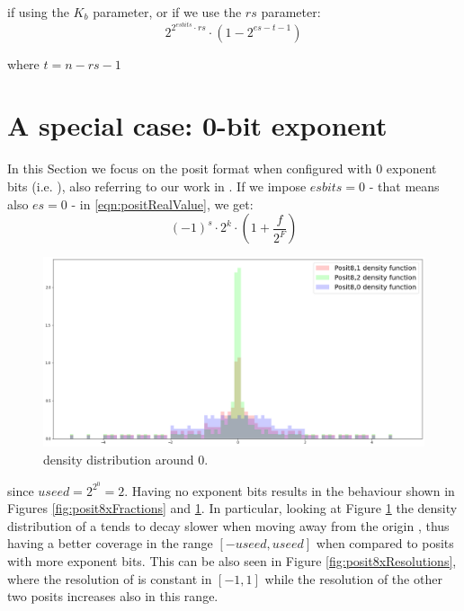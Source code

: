 if using the $K_b$ parameter, or if we use the $rs$ parameter:
\begin{equation}
    2^{2^{esbits} \cdot rs} \cdot (1 - 2^{es - t - 1})
\end{equation}

where $ t = n - rs - 1$
\section{A special case: 0-bit exponent}\label{sec:Posit0bitExponent}

In this Section we focus on the posit format when configured with 0 exponent bits (i.e. ), also referring to our work in \cite{coco2020sensors}. If we impose $esbits = 0$ - that means also $es = 0$ - in \ref{eqn:positRealValue}, we get:
\begin{equation}\label{eqn:positRealValueExp0}
    (-1)^s \cdot \text{2}^{k} \cdot \left ( 1+ \frac{f}{2^F} \right)
\end{equation}


\begin{figure}
    \centering
    \includegraphics[width=\linewidth]{img/posit8xDensities.png}
    \caption{ density distribution around $0$.}
    \label{fig:posit8xDistributions}
\end{figure}

since $useed = 2^{2^0} = 2$. Having no exponent bits results in the behaviour shown in Figures \ref{fig:posit8xFractions} and \ref{fig:posit8xDistributions}. In particular, looking at Figure \ref{fig:posit8xDistributions} the density distribution of a  tends to decay slower when moving away from the origin , thus having a better coverage in the range $[-useed,useed]$ when compared to posits with more exponent bits. This can be also seen in Figure \ref{fig:posit8xResolutions}, where the resolution of  is constant in $[-1,1]$ while the resolution of the other two posits increases also in this range. 


